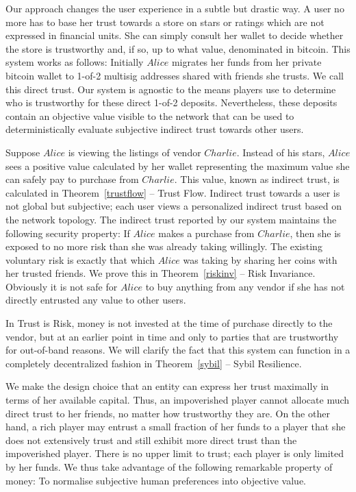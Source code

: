   Our approach changes the user experience in a subtle but drastic way. A user no more has to base her trust towards a
  store on stars or ratings which are not expressed in financial units. She can simply consult her wallet to decide whether
  the store is trustworthy and, if so, up to what value, denominated in bitcoin. This system works as follows: Initially
  $Alice$ migrates her funds from her private bitcoin wallet to 1-of-2 multisig addresses shared with friends she
  trusts. We call this direct trust. Our system is agnostic to the means players use to determine who is trustworthy for these
  direct 1-of-2 deposits. Nevertheless, these deposits contain an objective value visible to the network that can be used to
  deterministically evaluate subjective indirect trust towards other users.

  Suppose $Alice$ is viewing the listings of vendor $Charlie$. Instead of his stars, $Alice$ sees a positive value calculated
  by her wallet representing the maximum value she can safely pay to purchase from $Charlie$. This value, known as indirect
  trust, is calculated in Theorem~\ref{trustflow} -- Trust Flow. Indirect trust towards a user is not global but subjective;
  each user views a personalized indirect trust based on the network topology.  The indirect trust reported by our system
  maintains the following security property: If $Alice$ makes a purchase from $Charlie$, then she is exposed to no more risk
  than she was already taking willingly. The existing voluntary risk is exactly that which $Alice$ was taking by sharing her
  coins with her trusted friends. We prove this in Theorem~\ref{riskinv} -- Risk Invariance. Obviously it is not safe for
  $Alice$ to buy anything from any vendor if she has not directly entrusted any value to other users.

  In Trust is Risk, money is not invested at the time of purchase directly to the vendor, but at an earlier point in time and
  only to parties that are trustworthy for out-of-band reasons. We will clarify the fact that this system can function in a
  completely decentralized fashion in Theorem~\ref{sybil} -- Sybil Resilience.

  We make the design choice that an entity can express her trust maximally in terms of her available capital. Thus, an
  impoverished player cannot allocate much direct trust to her friends, no matter how trustworthy they are. On the other hand,
  a rich player may entrust a small fraction of her funds to a player that she does not extensively trust and still exhibit
  more direct trust than the impoverished player. There is no upper limit to trust; each player is only limited by her funds.
  We thus take advantage of the following remarkable property of money: To normalise subjective human preferences into
  objective value.

